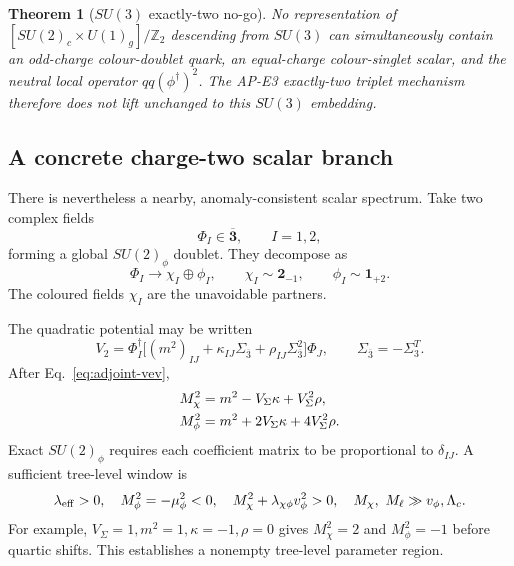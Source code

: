 \documentclass[11pt]{article}
\newtheorem{theorem}{Theorem}[section]
\theoremstyle{definition}
\theoremstyle{remark}
\newcommand{\ZZ}{\mathbb Z}
\begin{document}
\begin{theorem}[\(SU(3)\) exactly-two no-go]
No representation of
\([SU(2)_c\times U(1)_g]/\ZZ_2\) descending from \(SU(3)\) can
simultaneously contain an odd-charge colour-doublet quark, an equal-charge
colour-singlet scalar, and the neutral local operator
\(qq(\phi^\dagger)^2\).  The AP-E3 exactly-two triplet mechanism therefore
does not lift unchanged to this \(SU(3)\) embedding.
\end{theorem}

\subsection{A concrete charge-two scalar branch}

There is nevertheless a nearby, anomaly-consistent scalar spectrum.  Take two
complex fields
\begin{equation}
 \Phi_I\in\overline{\bm3},\qquad I=1,2,
 \label{eq:antitriplet-scalars}
\end{equation}
forming a global \(SU(2)_\phi\) doublet.  They decompose as
\begin{equation}
 \Phi_I\longrightarrow\chi_I\oplus\phi_I,\qquad
 \chi_I\sim\bm2_{-1},\qquad
 \phi_I\sim\bm1_{+2}.
 \label{eq:scalar-decomposition}
\end{equation}
The coloured fields \(\chi_I\) are the unavoidable partners.

The quadratic potential may be written
\begin{equation}
 V_2=
 \Phi_I^\dagger
 \bigl[(m^2)_{IJ}+\kappa_{IJ}\Sigma_{\overline3}
 +\rho_{IJ}\Sigma_{\overline3}^2\bigr]\Phi_J,\qquad
 \Sigma_{\overline3}=-\Sigma_3^T.
 \label{eq:scalar-potential}
\end{equation}
After Eq.~\eqref{eq:adjoint-vev},
\begin{align}
 M_\chi^2&=m^2-V_\Sigma\kappa+V_\Sigma^2\rho,\notag\\
 M_\phi^2&=m^2+2V_\Sigma\kappa+4V_\Sigma^2\rho.
 \label{eq:scalar-mass-blocks}
\end{align}
Exact \(SU(2)_\phi\) requires each coefficient matrix to be proportional to
\(\delta_{IJ}\).  A sufficient tree-level window is
\begin{equation}
 \lambda_{\rm eff}>0,\quad
 M_\phi^2=-\mu_\phi^2<0,\quad
 M_\chi^2+\lambda_{\chi\phi}v_\phi^2>0,\quad
 M_\chi,\ M_\ell\gg v_\phi,\Lambda_c.
 \label{eq:scalar-window}
\end{equation}
For example,
\(V_\Sigma=1,m^2=1,\kappa=-1,\rho=0\) gives
\(M_\chi^2=2\) and \(M_\phi^2=-1\) before quartic shifts.  This establishes a
nonempty tree-level parameter region.
\end{document}

